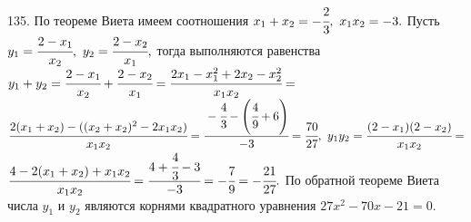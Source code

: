 135. По теореме Виета имеем соотношения $x_1+x_2=-\cfrac{2}{3},\ x_1x_2=-3.$ Пусть $y_1=\cfrac{2-x_1}{x_2},\ y_2=\cfrac{2-x_2}{x_1},$ тогда выполняются равенства
$y_1+y_2=\cfrac{2-x_1}{x_2}+\cfrac{2-x_2}{x_1}=\cfrac{2x_1-x_1^2+2x_2-x_2^2}{x_1x_2}=$\\$
\cfrac{2(x_1+x_2)-((x_2+x_2)^2-2x_1x_2)}{x_1x_2}=\cfrac{-\cfrac{4}{3}-\left(\cfrac{4}{9}+6\right)}{-3}=\cfrac{70}{27},\
y_1y_2=\cfrac{(2-x_1)(2-x_2)}{x_1x_2}=$\\$\cfrac{4-2(x_1+x_2)+x_1x_2}{x_1x_2}=\cfrac{4+\cfrac{4}{3}-3}{-3}=-\cfrac{7}{9}=-\cfrac{21}{27}.$ По обратной теореме Виета числа $y_1$ и $y_2$ являются корнями квадратного уравнения $27x^2-70x-21=0.$\\
